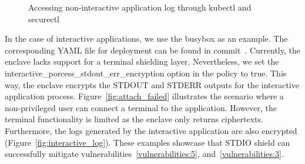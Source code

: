 \begin{figure}[!htb]

    
    
    \caption[Accessing non-interactive application log through kubectl and securectl]{Accessing non-interactive application log through kubectl and securectl}
\end{figure}

In the case of interactive applications, we use the busybox as an example. The corresponding YAML file for deployment can be found in commit~\cite*{artifacts_busybox}. Currently, the enclave lacks support for a terminal shielding layer. Nevertheless, we set the interactive\_porcess\_stdout\_err\_encryption option in the policy to true. 
This way, the enclave encrypts the STDOUT and STDERR outputs for the interactive application process. Figure~\ref{fig:attach_failed} illustrates the scenario where a non-privileged user can connect a terminal to the application. However, the terminal functionality is limited as the enclave only returns ciphertexts. 
Furthermore, the logs generated by the interactive application are also encrypted (Figure~\ref{fig:interactive_log}). These examples showcase that STDIO shield can successfully mitigate vulnerabilities~\ref{vulnerabilities:5}, and~\ref{vulnerabilities:3}.


